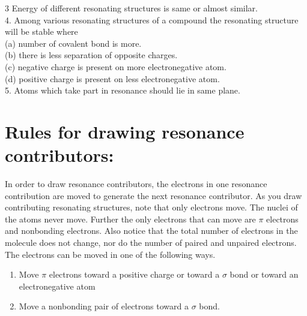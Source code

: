 \documentclass[10pt]{article}
\begin{document}
3 Energy of different resonating structures is same or almost similar.\\
4. Among various resonating structures of a compound the resonating structure will be stable where\\
(a) number of covalent bond is more.\\
(b) there is less separation of opposite charges.\\
(c) negative charge is present on more electronegative atom.\\
(d) positive charge is present on less electronegative atom.\\
5. Atoms which take part in resonance should lie in same plane.

\section*{Rules for drawing resonance contributors:}
In order to draw resonance contributors, the electrons in one resonance contribution are moved to generate the next resonance contributor. As you draw contributing resonating structures, note that only electrons move. The nuclei of the atoms never move. Further the only electrons that can move are $\pi$ electrons and nonbonding electrons. Also notice that the total number of electrons in the molecule does not change, nor do the number of paired and unpaired electrons. The electrons can be moved in one of the following ways.

\begin{enumerate}
  \item Move $\pi$ electrons toward a positive charge or toward a $\sigma$ bond or toward an electronegative atom
  \item Move a nonbonding pair of electrons toward a $\sigma$ bond.
\end{enumerate}
\end{document}
